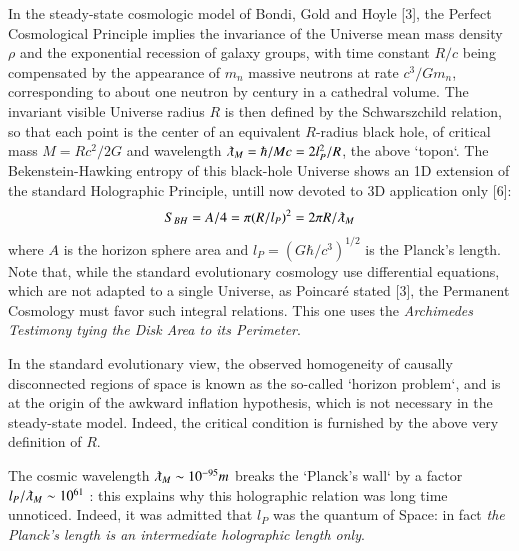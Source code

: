 \documentclass[twoside,draft]{article}
\begin{document}
\begin{sloppypar}
{In the steady-state cosmologic model of Bondi, Gold and Hoyle [3], the Perfect Cosmological
Principle implies the invariance of the Universe mean mass density $\rho$ and the exponential recession
of galaxy groups, with time constant $R/c$ being compensated by the appearance of $m_n$ massive
neutrons at rate $c^{3} /Gm_{n}$, corresponding to about one neutron by century in a cathedral volume. The invariant visible Universe radius $R$ is then defined by the
Schwarszchild relation, so that each point is the center of an equivalent $R$-radius black hole, of
critical mass $M = Rc^{2} /2G$ and wavelength $\lambdabar_M = \hbar/Mc = 2l_{P}^{2} /R$, the above `topon`. The Bekenstein-Hawking entropy of this black-hole Universe shows an 1D extension of the standard Holographic
Principle, untill now devoted to 3D application only [6]:
\begin{equation}
S_{BH} = A/4 = \pi(R/l_{P})^{2} = 2\pi R/\lambdabar_{M}
\end{equation}
where $A$ is the horizon sphere area and $l_{P} = (G\hbar/c^{3} )^{1/2}$ is the Planck's length. Note that, while the standard evolutionary cosmology use differential equations, which are not adapted to a single Universe, as Poincar\'{e} stated [3], the Permanent Cosmology must favor such integral relations. This one
uses the \textit{Archimedes Testimony tying the Disk Area to its Perimeter}.

In the standard evolutionary view, the observed homogeneity of causally disconnected regions
of space is known as the so-called `horizon problem`, and is at the origin of the awkward inflation
hypothesis, which is not necessary in the steady-state model. Indeed, the critical condition is
furnished by the above very definition of $R$.

The cosmic wavelength $\lambdabar_{M}\sim 10^{-95} m$ breaks the `Planck's wall` by a factor $l_{P}/\lambdabar_{M}\sim 10^{61}$ : this explains why this holographic relation was long time unnoticed. Indeed, it was admitted that $l_{P}$ was the quantum of Space: in fact \textit{the Planck's length is an intermediate holographic length only}.

}
\end{sloppypar}
\end{document}
